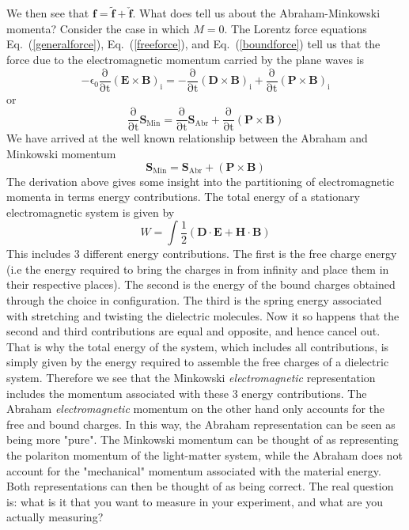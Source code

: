We then see that $\mathbf{f}=\tilde{\mathbf{f}}+\check{\mathbf{f}}$.  What does tell us about the Abraham-Minkowski momenta?
Consider the case in which $M=0$. The Lorentz force equations Eq.\ (\ref{generalforce}), Eq.\ (\ref{freeforce}), and Eq.\ (\ref{boundforce}) tell us that the force due to the electromagnetic momentum carried by the plane waves is
\begin{equation}
\mathrm{-\epsilon_0\frac{\partial}{\partial t} \left(\mathbf{E}\times \mathbf{B}\right)_i=-\frac{\partial}{\partial t} \left(\mathbf{D}\times \mathbf{B}\right)_i+\frac{\partial}{\partial t} \left(\mathbf{P}\times \mathbf{B}\right)_i}
\end{equation}
or
\begin{equation}
\mathrm{\frac{\partial}{\partial t}\mathbf{S}_{Min}=\frac{\partial}{\partial t}\mathbf{S}_{Abr}+\frac{\partial}{\partial t}\left(\mathbf{P}\times \mathbf{B}\right)}
\end{equation}
We have arrived at the well known relationship between the Abraham and Minkowski momentum 
\begin{equation}
\mathrm{\mathbf{S}_{Min}=\mathbf{S}_{Abr}+\left(\mathbf{P}\times \mathbf{B}\right)}
\end{equation}
The derivation above gives some insight into the partitioning of electromagnetic momenta in terms energy contributions.  The total energy of a stationary electromagnetic system is given by
\begin{equation}
W=\int\frac{1}{2}\left(\mathbf{D}\cdot\mathbf{E}+\mathbf{H}\cdot\mathbf{B}\right)
\end{equation}
This includes 3 different energy contributions.  The first is the free charge energy (i.e the energy required to bring the charges in from infinity and place them in their respective places).  The second is the energy of the bound charges obtained through the choice in configuration.  The third is the spring energy associated with stretching and twisting the dielectric molecules. Now it so happens that the second and third contributions are equal and opposite, and hence cancel out.  That is why the total energy of the system, which includes all contributions, is simply given by the energy required to assemble the free charges of a dielectric system.  Therefore we see that the Minkowski \emph{electromagnetic} representation includes the momentum associated with these 3 energy contributions.  The Abraham \emph{electromagnetic} momentum on the other hand only accounts for the free and bound charges.  In this way, the Abraham representation can be seen as being more "pure". The Minkowski momentum can be thought of as representing the polariton momentum of the light-matter system, while the Abraham does not account for the "mechanical" momentum associated with the material energy.  Both representations can then be thought of as being correct. The real question is: what is it that you want to measure in your experiment, and what are you actually measuring?

